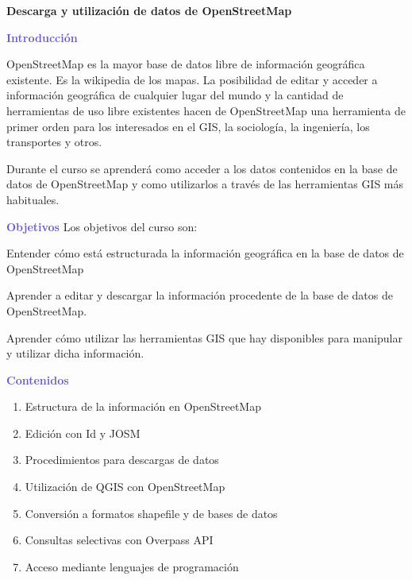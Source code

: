 \documentclass[10pt, oneside]{article}
\begin{document}
\sffamily

\hspace*{-1em}\Large{\textbf{\textcolor{Azul}{Descarga y utilización de datos de OpenStreetMap}}}

\vspace{2em}
\hspace*{-2em}\textbf{\textcolor{SlateBlue}{Introducción}}

OpenStreetMap es la mayor base de datos libre de información geográfica existente. Es la wikipedia de los mapas. La posibilidad de editar y acceder a información geográfica de cualquier lugar del mundo y la cantidad de herramientas de uso libre existentes hacen de OpenStreetMap una herramienta de primer orden para los interesados en el GIS, la sociología, la ingeniería, los transportes y otros.

Durante el curso se aprenderá como acceder a los datos contenidos en la base de datos de OpenStreetMap y como utilizarlos a través de las herramientas GIS más habituales.

\vspace{1em}
\hspace*{-2em}\textbf{\textcolor{SlateBlue}{Objetivos}}
Los objetivos del curso son:

Entender cómo está estructurada la información geográfica en la base de datos de OpenStreetMap

Aprender a editar y descargar la información procedente de la base de datos de OpenStreetMap.

Aprender cómo utilizar las herramientas GIS que hay disponibles para manipular y utilizar dicha información.

\vspace{1em}
\hspace*{-2em}\textbf{\textcolor{SlateBlue}{Contenidos}}

\begin{enumerate}
\itemsep=0cm
  \item Estructura de la información en OpenStreetMap
  \item Edición con Id y JOSM
  \item Procedimientos para descargas de datos
  \item Utilización de QGIS con OpenStreetMap
  \item Conversión a formatos shapefile y de bases de datos
  \item Consultas selectivas con Overpass API
  \item Acceso mediante lenguajes de programación
\end{enumerate}
\end{document}
